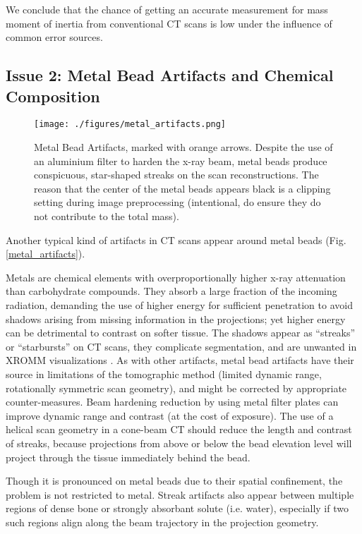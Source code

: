 We conclude that the chance of getting an accurate measurement for mass moment of inertia from conventional CT scans is low under the influence of common error sources.



\subsection{Issue 2: Metal Bead Artifacts and Chemical Composition}
\label{sec:orgb44af86}

\begin{figure}[htbp]
\centering
\texttt{[image: ./figures/metal\_artifacts.png]}
\caption{\label{fig:metal_artifacts}Metal Bead Artifacts, marked with orange arrows. Despite the use of an aluminium filter to harden the x-ray beam, metal beads produce conspicuous, star-shaped streaks on the scan reconstructions. The reason that the center of the metal beads appears black is a clipping setting during image preprocessing (intentional, do ensure they do not contribute to the total mass).}
\end{figure}

Another typical kind of artifacts in CT scans appear around metal beads (Fig. \ref{metal_artifacts}).

Metals are chemical elements with overproportionally higher x-ray attenuation than carbohydrate compounds.
They absorb a large fraction of the incoming radiation, demanding the use of higher energy for sufficient penetration to avoid shadows arising from missing information in the projections; yet higher energy can be detrimental to contrast on softer tissue.
The shadows appear as ``streaks'' or ``starbursts'' on CT scans, they complicate segmentation, and are unwanted in XROMM visualizations \citep{Brainerd2010}.
As with other artifacts, metal bead artifacts have their source in limitations of the tomographic method (limited dynamic range, rotationally symmetric scan geometry), and might be corrected by appropriate counter-measures.
Beam hardening reduction by using metal filter plates can improve dynamic range and contrast (at the cost of exposure).
The use of a helical scan geometry in a cone-beam CT should reduce the length and contrast of streaks, because projections from above or below the bead elevation level will project through the tissue immediately behind the bead.

Though it is pronounced on metal beads due to their spatial confinement, the problem is not restricted to metal.
Streak artifacts also appear between multiple regions of dense bone or strongly absorbant solute (i.e. water), especially if two such regions align along the beam trajectory in the projection geometry.


